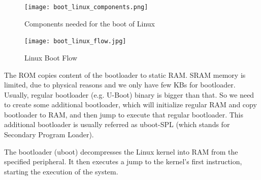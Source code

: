 \begin{figure}[ht]
    \centering
    \texttt{[image: boot\_linux\_components.png]}
    \caption{Components needed for the boot of Linux}
\end{figure}

\begin{figure}[ht]
    \centering
    \texttt{[image: boot\_linux\_flow.jpg]}
    \caption{Linux Boot Flow}
\end{figure}

The ROM copies content of the bootloader to static RAM. SRAM memory is limited,
due to physical reasons and we only have few KBs for bootloader.
Usually, regular bootloader (e.g. U-Boot) binary is bigger than that.
So we need to create some additional bootloader, which will initialize regular
RAM and copy bootloader to RAM, and then jump to execute that regular
bootloader. This additional bootloader is usually referred as uboot-SPL
(which stands for Secondary Program Loader).

The bootloader (uboot) decompresses the Linux kernel into RAM from the
specified peripheral. It then executes a jump to the kernel's first
instruction, starting the execution of the system.


